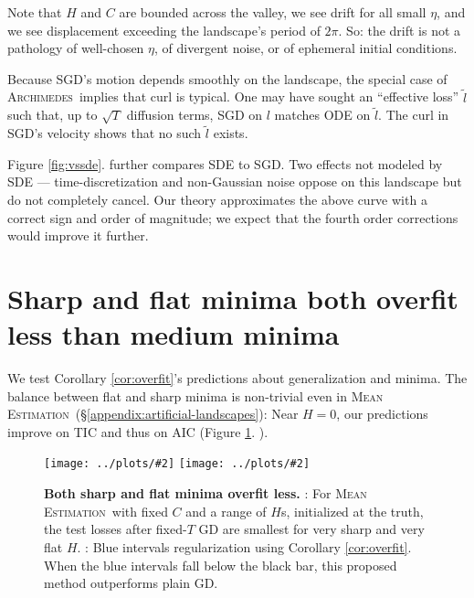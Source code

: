 \documentclass[openany, notitlepage, justified]{tufte-book}
\newcommand{\oftwo}[1]{%
    {\tiny\raisebox{0.04cm}{$%
        \ifthenelse{\equal{#1}{0}}{{\color{moor}\blacksquare}}{\square}%
        \ifthenelse{\equal{#1}{1}}{{\color{moor}\blacksquare}}{\square}%
    $}}%
}
\theoremstyle{plain}
\theoremstyle{definition}
\newcommand{\pmoo}[2]{\texttt{[image: ../plots/\#2]}}
\newcommand{\Archimedes}{\textsc{Archimedes}}
\newcommand{\MeanEstimation}{\textsc{Mean Estimation}}
\begin{document}
        Note that $H$ and $C$ are
        bounded across the valley, we see drift for all small $\eta$,
        and we see displacement exceeding the landscape's period of
        $2\pi$.  So: the drift is not a pathology of well-chosen
        $\eta$, of divergent noise, or of ephemeral initial conditions.

        Because SGD's motion depends smoothly on the landscape, the special
        case of \Archimedes\ implies that curl is typical.
        One may have sought an ``effective loss'' $\tilde{l}$ such that, up to
        $\sqrt{T}$ diffusion terms, SGD on $l$ matches ODE on $\tilde{l}$.  The
        curl in SGD's velocity shows that no such $\tilde{l}$
        exists.
        
        Figure \ref{fig:vssde}.\oftwo{1} further compares SDE to SGD.  Two
        effects not modeled by SDE --- time-discretization and non-Gaussian
        noise oppose on this landscape but do not completely cancel.  Our
        theory approximates the above curve with a correct sign and order of
        magnitude; we expect that the fourth order corrections would improve it
        further.


    \section{Sharp and flat minima both overfit less than medium minima} \label{subsect:overfit}

        We test Corollary \ref{cor:overfit}'s predictions about generalization
        and minima.  The balance between flat and sharp minima is non-trivial
        even in \MeanEstimation\ (\S\ref{appendix:artificial-landscapes}):
        Near $H=0$, our predictions improve on
        TIC \citep{di18} and thus on
        AIC (Figure \ref{fig:tic}.\oftwo{0}).
        \begin{figure} 
            \centering
            \pmoo{3.75cm}{neurips-tak}
            \pmoo{3.5cm}{tak-reg}
            \caption{
                \textbf{Both sharp and flat minima overfit less.}
                \protect\oftwo{0}: For \MeanEstimation\, with fixed $C$ and a
                range of $H$s, initialized at the truth, the test losses after
                fixed-$T$ GD are smallest for very sharp and very flat $H$.
                \protect\oftwo{1}: Blue intervals regularization using Corollary
                \ref{cor:overfit}.  When the blue intervals fall below the
                black bar, this proposed method outperforms plain GD.    
            }
            \label{fig:tic}
        \end{figure}
\end{document}
